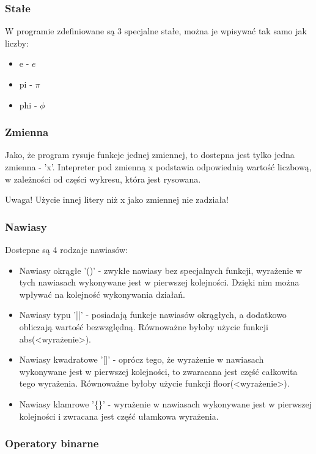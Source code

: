\documentclass[a4paper]{article}
\begin{document}
\subsubsection{Stałe}

W programie zdefiniowane są 3 specjalne stałe, można je wpisywać tak samo jak liczby:
\begin{itemize}
    \item e - $e$
    \item pi - $\pi$
    \item phi - $\phi$
\end{itemize}

\subsubsection{Zmienna}

Jako, że program rysuje funkcje jednej zmiennej, to dostepna jest tylko jedna zmienna - 'x'. Intepreter pod zmienną x podstawia odpowiednią wartość liczbową, w zależności od części wykresu, która jest rysowana.

Uwaga! Użycie innej litery niż x jako zmiennej nie zadziała!

\subsubsection{Nawiasy}

Dostepne są 4 rodzaje nawiasów:
\begin{itemize}
    \item Nawiasy okrągłe '()' - zwykłe nawiasy bez specjalnych funkcji, wyrażenie w tych nawiasach wykonywane jest w pierwszej kolejności. Dzięki nim można wpływać na kolejność wykonywania działań.
    \item Nawiasy typu '||' - posiadają funkcje nawiasów okrągłych, a dodatkowo obliczają wartość bezwzględną. Równoważne byłoby użycie funkcji abs(<wyrażenie>).
    \item Nawiasy kwadratowe '[]' - oprócz tego, że wyrażenie w nawiasach wykonywane jest w pierwszej kolejności, to zwaracana jest część całkowita tego wyrażenia. Równoważne byłoby użycie funkcji floor(<wyrażenie>).
    \item Nawiasy klamrowe '\{\}' - wyrażenie w nawiasach wykonywane jest w pierwszej kolejności i zwracana jest część ułamkowa wyrażenia.
\end{itemize}

\subsubsection{Operatory binarne}
\end{document}
